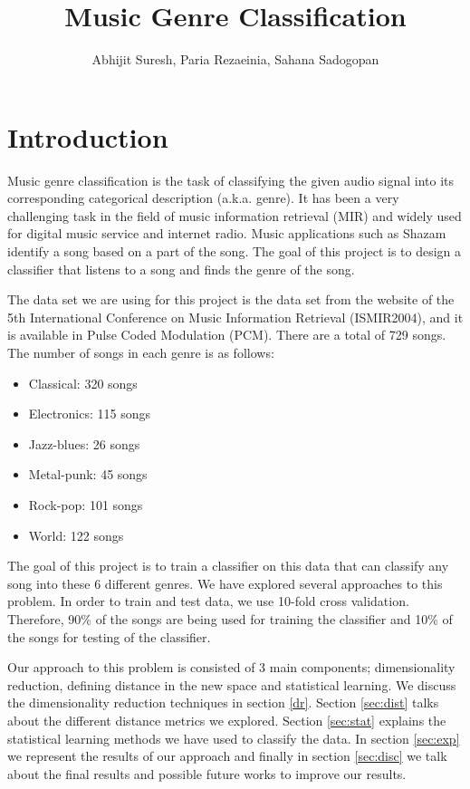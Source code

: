 \documentclass[12pt]{article}
\title{Music Genre Classification}
\author{Abhijit Suresh, Paria Rezaeinia, Sahana Sadogopan}
\begin{document}
	\maketitle

\section{Introduction}
Music genre classification is the task of classifying the given audio signal into its corresponding categorical description (a.k.a. genre). It has been a very challenging task in the field of music information retrieval (MIR) and widely used for digital music service and internet radio. Music applications such as Shazam identify a song based on a part of the song. The goal of this project is to design a classifier that listens to a song and finds the genre of the song. 

The data set we are using for this project is the data set from the website of the 5th International Conference on Music Information Retrieval (ISMIR2004), and it is available in Pulse Coded Modulation (PCM). There are a total of 729 songs. The number of songs in each genre is as follows:
\begin{itemize}
	\item Classical: 320 songs
	\item Electronics: 115 songs
	\item Jazz-blues: 26 songs
	\item Metal-punk: 45 songs
	\item Rock-pop: 101 songs
	\item World: 122 songs
\end{itemize}
The goal of this project is to train a classifier on this data that can classify any song into these 6 different genres. We have explored several approaches to this problem. In order to train and test data, we use 10-fold cross validation. Therefore, 90\% of the songs are being used for training the classifier and 10\% of the songs for testing of the classifier.

Our approach to this problem is consisted of 3 main components; dimensionality reduction, defining distance in the new space and statistical learning. We discuss the dimensionality reduction techniques in section \ref{dr}. Section \ref{sec:dist} talks about the different distance metrics we explored. Section \ref{sec:stat} explains the statistical learning methods we have used to classify the data. In section \ref{sec:exp} we represent the results of our approach and finally in section \ref{sec:disc} we talk about the final results and possible future works to improve our results.
\end{document}
